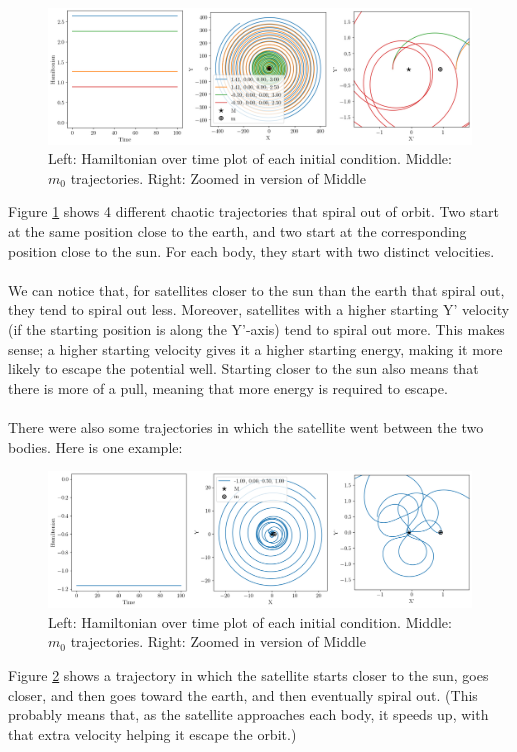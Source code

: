 \documentclass[11pt]{article}
\begin{document}
\begin{figure}[H]
    \centering
    \includegraphics[width=0.7\linewidth]{figures/spiral2.png}
    \caption{Left: Hamiltonian over time plot of each initial condition. Middle: $m_0$ trajectories. Right: Zoomed in version of Middle}
    \label{fig:escape trajectories}
\end{figure}
\noindent
Figure \ref{fig:escape trajectories} shows 4 different chaotic trajectories that spiral out of orbit. Two start at the same position close to the earth, and two start at the corresponding position close to the sun. For each body, they start with two distinct velocities.
\\
\\
\noindent
We can notice that, for satellites closer to the sun than the earth that spiral out, they tend to spiral out less. Moreover, satellites with a higher starting Y' velocity (if the starting position is along the Y'-axis) tend to spiral out more. This makes sense; a higher starting velocity gives it a higher starting energy, making it more likely to escape the potential well. Starting closer to the sun also means that there is more of a pull, meaning that more energy is required to escape. 
\\
\\
\noindent
There were also some trajectories in which the satellite went between the two bodies. Here is one example:
\begin{figure}[H]
    \centering
    \includegraphics[width=0.7\linewidth]{figures/spiral.png}
    \caption{Left: Hamiltonian over time plot of each initial condition. Middle: $m_0$ trajectories. Right: Zoomed in version of Middle}
    \label{fig:interesting trajectories1}
\end{figure}
\noindent
Figure \ref{fig:interesting trajectories1} shows a trajectory in which the satellite starts closer to the sun, goes closer, and then goes toward the earth, and then eventually spiral out. (This probably means that, as the satellite approaches each body, it speeds up, with that extra velocity helping it escape the orbit.)
\end{document}
